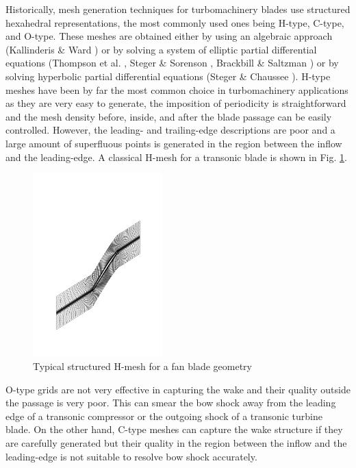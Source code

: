  Historically, mesh generation techniques for turbomachinery blades use
 structured hexahedral representations, the most commonly
 used ones being H-type, C-type, and O-type. These meshes are obtained either
 by using an algebraic approach (Kallinderis \& Ward )
 or by solving a system of elliptic
 partial differential equations (Thompson et al. ,
 Steger \& Sorenson , Brackbill \& Saltzman
 ) or by solving hyperbolic partial differential equations
 (Steger \& Chaussee ).
 H-type meshes have been by far the most common choice in turbomachinery
 applications as they are very easy to generate, the imposition of
 periodicity is straightforward and the mesh density before, inside,
 and after the blade passage can be easily controlled. However,
 the leading- and trailing-edge descriptions are poor and a large
 amount of superfluous points is generated in the region between
 the inflow and the leading-edge. A classical H-mesh for a transonic blade
 is shown in Fig. \ref{Hmesh.fig}.
%
\begin{figure}[ht]
  \centerline{\includegraphics[width=50mm,clip=t]{CHAP_MESH/FIGURE/Hmesh.pdf}}
 \caption{Typical structured H-mesh for a fan blade geometry}
 \label{Hmesh.fig}
\end{figure}
%
 O-type grids are not very effective in capturing the wake and their
 quality outside the passage is very poor. This can smear
 the bow shock away from the leading edge of a transonic compressor
 or the outgoing shock of a transonic turbine blade.
 On the other hand, C-type meshes can capture the wake structure if
 they are carefully generated but their quality in the region between
 the inflow and the leading-edge is not suitable to resolve bow shock
 accurately.

